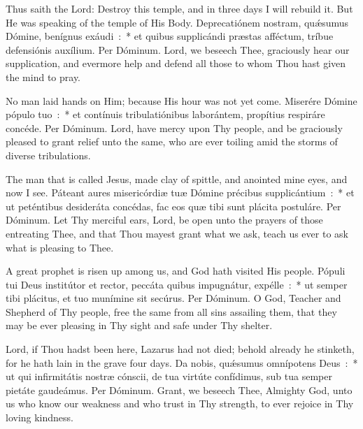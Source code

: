 {{  
  {Thus saith the Lord: Destroy this temple, and in three days I will rebuild it. But He was speaking of the temple of His Body.}
  {Deprecatiónem nostram, quǽ\-su\-mus Dómine, benígnus exáudi~:~* et quibus supplicándi præstas afféctum, tríbue defensiónis auxílium. Per Dóminum.}
  {Lord, we beseech Thee, graciously hear our supplication, and evermore help and defend all those to whom Thou hast given the mind to pray.}

  {No man laid hands on Him; because His hour was not yet come.}
  {Miserére Dómine pópulo tuo~:~* et contínuis tribulatiónibus laborántem, propítius respiráre concéde. Per Dóminum.}
  {Lord, have mercy upon Thy people, and be graciously pleased to grant relief unto the same, who are ever toiling amid the storms of diverse tribulations.}

  {The man that is called Jesus, made clay of spittle, and anointed mine eyes, and now I see.}
  {Páteant aures misericórdiæ tuæ Dómine précibus supplicántium~:~* et ut peténtibus desideráta concédas, fac eos quæ tibi sunt plácita postuláre. Per Dóminum.}
  {Let Thy merciful ears, Lord, be open unto the prayers of those entreating Thee, and that Thou mayest grant what we ask, teach us ever to ask what is pleasing to Thee.}

  {A great prophet is risen up among us, and God hath visited His people.}
  {Pópuli tui Deus institútor et rector, peccáta quibus impugnátur, expélle~:~* ut semper tibi plácitus, et tuo munímine sit secúrus. Per Dóminum.}
  {O God, Teacher and Shepherd of Thy people, free the same from all sins assailing them, that they may be ever pleasing in Thy sight and safe under Thy shelter.}

  \let\vrtitle=\undefined
  {Lord, if Thou hadst been here, Lazarus had not died; behold already he stinketh, for he hath lain in the grave four days.}
  {Da nobis, quǽsumus omnípotens Deus~:~* ut qui infirmitátis nostræ cónscii, de tua virtúte confídimus, sub tua semper pietáte gaudeámus. Per Dóminum.}
  {Grant, we beseech Thee, Almighty God, unto us who know our weakness and who trust in Thy strength, to ever rejoice in Thy loving kindness.}
}
  
}
